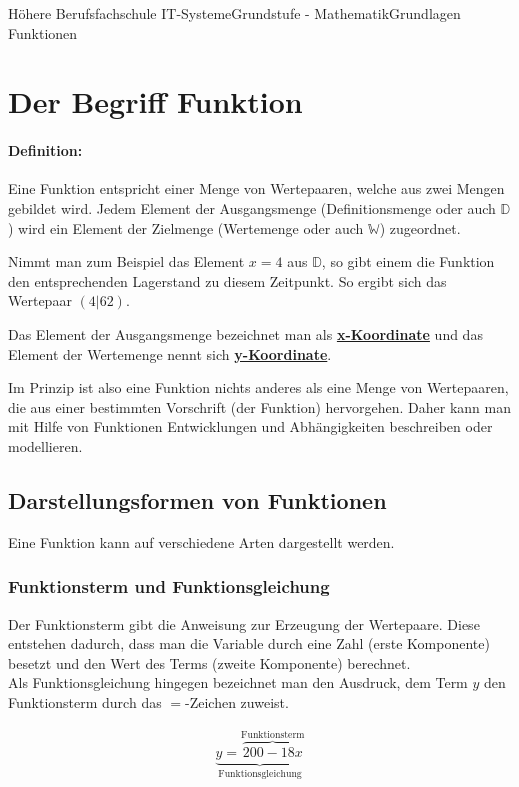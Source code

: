\documentclass[11pt,twocolumn,oneside,openany,headings=optiontotoc,11pt,numbers=noenddot]{article}
\begin{document}
\begin{worksheet}{Höhere Berufsfachschule IT-Systeme}{Grundstufe - Mathematik}{Grundlagen Funktionen}
		\section{Der Begriff \glqq{}Funktion\grqq{}}
		\begin{framed}
			\noindent
			\paragraph{Definition:} Eine Funktion entspricht einer Menge von Wertepaaren, welche aus zwei Mengen gebildet wird. Jedem Element der Ausgangsmenge (Definitionsmenge oder auch \(\mathbb{D}\)) wird ein Element der Zielmenge (Wertemenge oder auch \(\mathbb{W}\)) zugeordnet.
		\end{framed}
		\noindent
		Nimmt man zum Beispiel das Element \(x=4\) aus \(\mathbb{D}\), so gibt einem die Funktion den entsprechenden Lagerstand zu diesem Zeitpunkt. So ergibt sich das Wertepaar \((4|62)\).\\
		\par\bigskip\noindent
		Das Element der Ausgangsmenge bezeichnet man als \underline{\textbf{x-Koordinate}} und das Element der Wertemenge nennt sich \underline{\textbf{y-Koordinate}}.\\
		\par\bigskip\noindent
		Im Prinzip ist also eine Funktion nichts anderes als eine Menge von Wertepaaren, die aus einer bestimmten Vorschrift (der Funktion) hervorgehen. Daher kann man mit Hilfe von Funktionen Entwicklungen und Abhängigkeiten beschreiben oder modellieren.
		\subsection{Darstellungsformen von Funktionen}
		Eine Funktion kann auf verschiedene Arten dargestellt werden.
		\subsubsection*{Funktionsterm und Funktionsgleichung}
		Der Funktionsterm gibt die Anweisung zur Erzeugung der Wertepaare. Diese entstehen dadurch, dass man die Variable durch eine Zahl (erste Komponente) besetzt und den Wert des Terms (zweite Komponente) berechnet.\\
		Als Funktionsgleichung hingegen bezeichnet man den Ausdruck, dem Term \(y\) den Funktionsterm durch das \glqq{}\(=\)\grqq{}-Zeichen zuweist.\\
		\par\bigskip\noindent
		\begin{align*}
			\underbrace{y = \overbrace{200 -18x}^{\text{Funktionsterm}}}_{\text{Funktionsgleichung}}
		\end{align*}

\end{worksheet}
\end{document}
